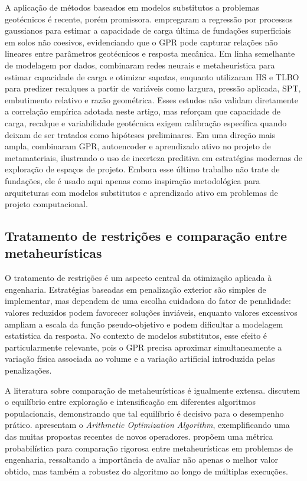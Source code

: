 A aplicação de métodos baseados em modelos substitutos a problemas geotécnicos é recente, porém promissora.  empregaram a regressão por processos gaussianos para estimar a capacidade de carga última de fundações superficiais em solos não coesivos, evidenciando que o GPR pode capturar relações não lineares entre parâmetros geotécnicos e resposta mecânica. Em linha semelhante de modelagem por dados,  combinaram redes neurais e metaheurística para estimar capacidade de carga e otimizar sapatas, enquanto  utilizaram HS e TLBO para predizer recalques a partir de variáveis como largura, pressão aplicada, SPT, embutimento relativo e razão geométrica. Esses estudos não validam diretamente a correlação empírica adotada neste artigo, mas reforçam que capacidade de carga, recalque e variabilidade geotécnica exigem calibração específica quando deixam de ser tratados como hipóteses preliminares. Em uma direção mais ampla,  combinaram GPR, autoencoder e aprendizado ativo no projeto de metamateriais, ilustrando o uso de incerteza preditiva em estratégias modernas de exploração de espaços de projeto. Embora esse último trabalho não trate de fundações, ele é usado aqui apenas como inspiração metodológica para arquiteturas com modelos substitutos e aprendizado ativo em problemas de projeto computacional.

\subsection{Tratamento de restrições e comparação entre metaheurísticas}
\label{sec:soa_restricoes_meta}

O tratamento de restrições é um aspecto central da otimização aplicada à engenharia. Estratégias baseadas em penalização exterior são simples de implementar, mas dependem de uma escolha cuidadosa do fator de penalidade: valores reduzidos podem favorecer soluções inviáveis, enquanto valores excessivos ampliam a escala da função pseudo-objetivo e podem dificultar a modelagem estatística da resposta. No contexto de modelos substitutos, esse efeito é particularmente relevante, pois o GPR precisa aproximar simultaneamente a variação física associada ao volume e a variação artificial introduzida pelas penalizações.

A literatura sobre comparação de metaheurísticas é igualmente extensa.  discutem o equilíbrio entre exploração e intensificação em diferentes algoritmos populacionais, demonstrando que tal equilíbrio é decisivo para o desempenho prático.  apresentam o \textit{Arithmetic Optimization Algorithm}, exemplificando uma das muitas propostas recentes de novos operadores.  propõem uma métrica probabilística para comparação rigorosa entre metaheurísticas em problemas de engenharia, ressaltando a importância de avaliar não apenas o melhor valor obtido, mas também a robustez do algoritmo ao longo de múltiplas execuções.

